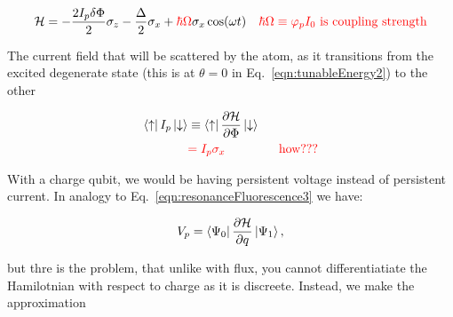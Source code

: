    \begin{equation}\label{eqn:resonanceFluorescence2}
   	\mathcal{H} = -\frac{2I_p\delta\Phi}{2}\sigma_z - \frac{\Delta}{2}\sigma_x + {\color{red}{\hbar\Omega}}\sigma_x\cos(\omega t) \quad {\color{red}{\hbar\Omega \equiv \varphi_pI_0 \text{ is coupling strength}}}
   \end{equation}
  
  \noindent The current field that will be scattered by the atom, as it transitions from the excited degenerate state (this is at $ \theta = 0 $ in Eq.~\eqref{eqn:tunableEnergy2}) \isuperposition{-} to the other \isuperposition{+} 
  
  \begin{equation}\label{eqn:resonanceFluorescence3}
  	\begin{aligned}
	  	\bra{\uparrow}I_p\ket{\downarrow} &\equiv \bra{\uparrow}\difffrac{\mathcal{H}}{\Phi}\ket{\downarrow} \\
	  	& \red{= I_p\sigma_x \qquad\qquad \text{ how???}}
  	\end{aligned} %
  \end{equation}
  
  
With a charge qubit, we would be having persistent voltage instead of persistent current. In analogy to Eq.~\eqref{eqn:resonanceFluorescence3} we have:
  
  \[
  	V_p = \bra{\Psi_0} \frac{\partial\mathcal{H}}{\partial q}\ket{\Psi_1},
  \]
  
  \noindent but thre is the problem, that unlike with flux, you cannot differentiatiate the Hamilotnian with respect to charge as it is discreete. Instead, we make the approximation
  
